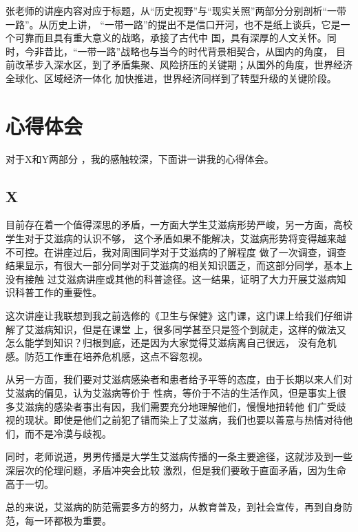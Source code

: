 \documentclass[a4paper]{cctart}
\numberwithin{equation}{section} \pagestyle{fancy}
\begin{document}
张老师的讲座内容对应于标题，从“历史视野”与“现实关照”两部分分别剖析“一带一路”。从历史上讲，
“一带一路”的提出不是信口开河，也不是纸上谈兵，它是一个可靠而且具有重大意义的战略，承接了古代中
国，具有深厚的人文关怀。同时，今非昔比，“一带一路”战略也与当今的时代背景相契合，从国内的角度，
目前改革步入深水区，到了矛盾集聚、风险挤压的关键期；从国外的角度，世界经济全球化、区域经济一体化
加快推进，世界经济同样到了转型升级的关键阶段。

\DeclareRobustCommand\CTeX{$\mathbb{C}$\kern-.05em\TeX{}}

\section{心得体会}\label{2}
对于X和Y两部分 ，我的感触较深，下面讲一讲我的心得体会。
\subsection{X}
目前存在着一个值得深思的矛盾，一方面大学生艾滋病形势严峻，另一方面，高校学生对于艾滋病的认识不够，
这个矛盾如果不能解决，艾滋病形势将变得越来越不可控。在讲座过后，我对周围同学对于艾滋病的了解程度
做了一次调查，调查结果显示，有很大一部分同学对于艾滋病的相关知识匮乏，而这部分同学，基本上没有接触
过艾滋病讲座或其他的科普途径。这一结果，证明了大力开展艾滋病知识科普工作的重要性。

这次讲座让我联想到我之前选修的《卫生与保健》这门课，这门课上给我们仔细讲解了艾滋病知识，但是在课堂
上，很多同学甚至只是签个到就走，这样的做法又怎么能学到知识？归根到底，还是因为大家觉得艾滋病离自己很远，
没有危机感。防范工作重在培养危机感，这点不容忽视。

从另一方面，我们要对艾滋病感染者和患者给予平等的态度，由于长期以来人们对艾滋病的偏见，认为艾滋病等价于
性病，等价于不洁的生活作风，但是事实上很多艾滋病的感染者事出有因，我们需要充分地理解他们，慢慢地扭转他
们广受歧视的现状。即使是他们之前犯了错而染上了艾滋病，我们也要以善意与热情对待他们，而不是冷漠与歧视。

同时，老师说道，男男传播是大学生艾滋病传播的一条主要途径，这就涉及到一些深层次的伦理问题，矛盾冲突会比较
激烈，但是我们要敢于直面矛盾，因为生命高于一切。

总的来说，艾滋病的防范需要多方的努力，从教育普及，到社会宣传，再到自身防范，每一环都极为重要。
\end{document}
